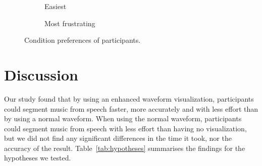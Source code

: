 \begin{figure}[h]
\centering
\begin{subfigure}{.5\textwidth}
  \centering
  \caption{Easiest}
  \label{fig:easiest}
\end{subfigure}%
\begin{subfigure}{.5\textwidth}
  \centering
  \caption{Most frustrating}
  \label{fig:frustrating}
\end{subfigure}
\caption{Condition preferences of participants.}
\label{fig:visualization-comparison}
\end{figure}























\section{Discussion}\label{sec:vis-discuss}

Our study found that by using an enhanced waveform visualization, participants could segment music from speech faster,
more accurately and with less effort than by using a normal waveform.  When using the normal waveform, participants could
segment music from speech with less effort than having no visualization, but we did not find any significant
differences in the time it took, nor the accuracy of the result.  Table~\ref{tab:hypotheses} summarises the findings
for the hypotheses we tested.

